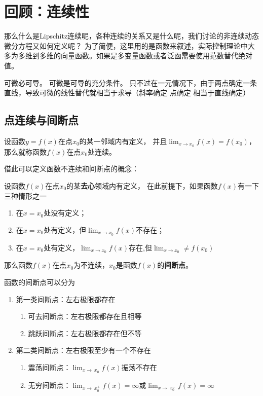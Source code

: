 


\section{回顾：连续性}\label{ux56deux987eux8fdeux7eedux6027}

那么什么是Lipschitz连续呢，各种连续的关系又是什么呢，我们讨论的非连续动态微分方程又如何定义呢？
为了简便，这里用的是函数来叙述，实际控制理论中大多为多维到多维的向量函数。如果是多变量函数或者泛函需要使用范数替代绝对值。

可微必可导。
可微是可导的充分条件。
只不过在一元情况下，由于两点确定一条直线，导致可微的线性替代就相当于求导（斜率确定 点确定 相当于直线确定）

\subsection{点连续与间断点}

\begin{definition}[点连续]
设函数\(y=f(x)\)在点\(x_0\)的某一邻域内有定义，
并且\(\lim_{x\to x_0}f(x)=f(x_0)\)，
那么就称函数\(f(x)\)在点\(x_0\)处连续。
\end{definition}

借此可以定义函数不连续和间断点的概念：
\begin{definition}
设函数\(f(x)\)在点\(x_0\)的某\textbf{去心}领域内有定义，
在此前提下，如果函数\(f(x)\)有一下三种情形之一 
\begin{enumerate}
  \item 在\(x=x_0\)处没有定义；
  \item 在\(x=x_0\)处有定义，但\(\lim_{x\to x_0} f(x)\)不存在；
  \item 在\(x=x_0\)处有定义，\(\lim_{x\to x_0} f(x)\)存在,但\(\lim_{x\to x_0}\neq f(x_0)\)
\end{enumerate}
那么函数\(f(x)\)在点\(x_0\)为不连续，\(x_0\)是函数\(f(x)\)的\textbf{间断点}。
\end{definition}



函数的间断点可以分为 
\begin{enumerate}
  \item 第一类间断点：左右极限都存在 
  \begin{enumerate}
    \item 可去间断点：左右极限都存在且相等 
    \item 跳跃间断点：左右极限都存在但不等 
  \end{enumerate}
  \item 第二类间断点：左右极限至少有一个不存在 
  \begin{enumerate}
    \item 震荡间断点：\(\lim_{x\to\ x_0} f(x)\)振荡不存在 
    \item 无穷间断点：\(\lim_{x\to\ x_0^+} f(x)=\infty\)或\(\lim_{x\to\ x_0^-} f(x)=\infty\)
  \end{enumerate}
\end{enumerate}


